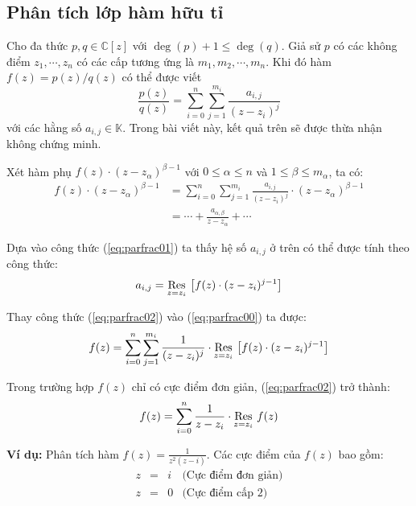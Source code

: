
	\subsection{Phân tích lớp hàm hữu tỉ}
	Cho đa thức \(p, q \in \mathbb C[z]\) với \(\deg(p) + 1 \le \deg(q)\). Giả sử \(p\) có các không điểm \(z_1,\cdots, z_n\) có các cấp tương ứng là \(m_1, m_2, \cdots, m_n\). Khi đó hàm \(f(z) = p(z)/q(z)\) có thể được viết
	\begin{equation}
		\frac{p(z)}{q(z)}  = \sum_{i = 0}^n \sum_{j = 1}^{m_i} \frac{a_{i,j}}{(z-z_i)^j}\label{eq:parfrac00}
	\end{equation}
	với các hằng số \(a_{i,j} \in \mathbb K\). Trong bài viết này, kết quả trên sẽ được thừa nhận không chứng minh.

	Xét hàm phụ \(f(z) \cdot (z - z_\alpha)^{\beta-1}\) với \(0\le\alpha\le n\) và \(1\le \beta\le m_\alpha\), ta có:
	\begin{align}
		f(z)\cdot(z-z_\alpha)^{\beta-1} &= \sum_{i=0}^n \sum_{j=1}^{m_i} \frac{a_{i,j}}{(z-z_i)^j}\cdot (z-z_\alpha)^{\beta-1}\\
		&= \cdots + \frac{a_{\alpha,\beta}}{z-z_\alpha} + \cdots \label{eq:parfrac01}
	\end{align}

	Dựa vào công thức (\ref{eq:parfrac01}) ta thấy hệ số \(a_{i,j}\) ở trên có thể được tính theo công thức:
	\begin{equation}
		a_{i,j} = \Res{\left[f(z)\cdot(z-z_i)^{j-1}\right]}{z=z_i}\label{eq:parfrac02}
	\end{equation}

	Thay công thức (\ref{eq:parfrac02}) vào (\ref{eq:parfrac00}) ta được:
	\begin{equation}
		f(z) = \sum_{i=0}^n\sum_{j=1}^{m_i} \frac{1}{(z-z_i)^j}\cdot \Res{\left[f(z)\cdot(z-z_i)^{j-1}\right]}{z=z_i} \label{eq:parfrac03}
	\end{equation}

	Trong trường hợp \(f(z)\) chỉ có cực điểm đơn giản, (\ref{eq:parfrac02}) trở thành:
	\begin{equation}
		f(z) = \sum_{i=0}^n \frac{1}{z-z_i}\cdot \Res{f(z)}{z=z_i}
	\end{equation}

	\textbf{Ví dụ:}
	Phân tích hàm \(f(z) = \frac{1}{z^2(z-i)}\). Các cực điểm của \(f(z)\) bao gồm:
	\[
		\begin{array}{cccc}
			z &=& i & \text{(Cực điểm đơn giản)}\\
			z &=& 0 & \text{(Cực điểm cấp 2)}\\
		\end{array}
	\]

